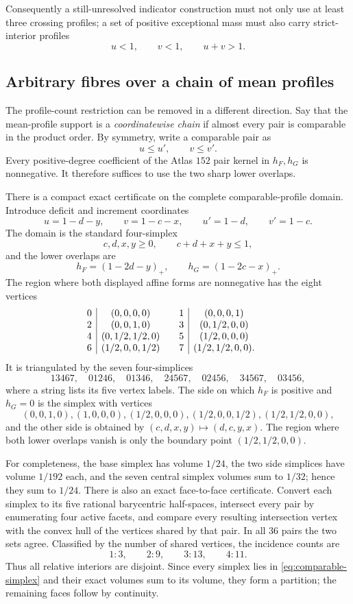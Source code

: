 \documentclass[11pt]{article}
\begin{document}
Consequently a still-unresolved indicator construction must not only use at
least three crossing profiles; a set of positive exceptional mass must also
carry strict-interior profiles
\[
 u<1,\qquad v<1,\qquad u+v>1.
\]

\subsection{Arbitrary fibres over a chain of mean profiles}

The profile-count restriction can be removed in a different direction.  Say
that the mean-profile support is a \emph{coordinatewise chain} if almost every
pair is comparable in the product order.  By symmetry, write a comparable
pair as
\[
 u\leq u',\qquad v\leq v'.
\]
Every positive-degree coefficient of the Atlas $152$ pair kernel in
$h_F,h_G$ is nonnegative.  It therefore suffices to use the two sharp lower
overlaps.

There is a compact exact certificate on the complete comparable-profile
domain.  Introduce deficit and increment coordinates
\[
 u=1-d-y,\qquad v=1-c-x,
 \qquad u'=1-d,\qquad v'=1-c.
\]
The domain is the standard four-simplex
\begin{equation}
 c,d,x,y\geq0,\qquad c+d+x+y\leq1,
 \label{eq:comparable-simplex}
\end{equation}
and the lower overlaps are
\[
 h_F=(1-2d-y)_+,\qquad h_G=(1-2c-x)_+.
\]
The region where both displayed affine forms are nonnegative has the eight
vertices
\[
\begin{array}{c|c@{\qquad}c|c@{\qquad}c}
0&(0,0,0,0)&1&(0,0,0,1)\\
2&(0,0,1,0)&3&(0,1/2,0,0)\\
4&(0,1/2,1/2,0)&5&(1/2,0,0,0)\\
6&(1/2,0,0,1/2)&7&(1/2,1/2,0,0).
\end{array}
\]
It is triangulated by the seven four-simplices
\[
13467,\quad01246,\quad01346,\quad24567,\quad02456,\quad34567,\quad03456,
\]
where a string lists its five vertex labels.  The side on which $h_F$ is
positive and $h_G=0$ is the simplex with vertices
\[
 (0,0,1,0),(1,0,0,0),(1/2,0,0,0),
 (1/2,0,0,1/2),(1/2,1/2,0,0),
\]
and the other side is obtained by $(c,d,x,y)\mapsto(d,c,y,x)$.  The region
where both lower overlaps vanish is only the boundary point
$(1/2,1/2,0,0)$.

For completeness, the base simplex has volume $1/24$, the two side
simplices have volume $1/192$ each, and the seven central simplex volumes
sum to $1/32$; hence they sum to $1/24$.  There is also an exact
face-to-face certificate.  Convert each simplex to its five rational
barycentric half-spaces, intersect every pair by enumerating four active
facets, and compare every resulting intersection vertex with the convex
hull of the vertices shared by that pair.  In all $36$ pairs the two sets
agree.  Classified by the number of shared vertices, the incidence counts
are
\[
 1:3,\qquad 2:9,\qquad 3:13,\qquad 4:11.
\]
Thus all relative interiors are disjoint.  Since every simplex lies in
\eqref{eq:comparable-simplex} and their exact volumes sum to its volume,
they form a partition; the remaining faces follow by continuity.
\end{document}
